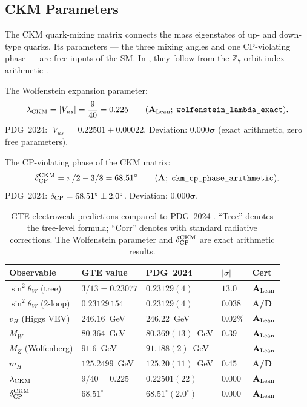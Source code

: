 \documentclass[11pt,openany]{book}
\theoremstyle{remark}
\newcommand{\GTE}{\text{GTE}}
\newcommand{\lean}[1]{%
  \penalty-100
  \begingroup\def\_{\textunderscore\allowbreak}\texttt{#1}\endgroup}
\newcommand{\sigW}{\sin^2\!\theta_W}
\newcommand{\CatA}{\textbf{A}}
\newcommand{\CatAL}{\ensuremath{\textbf{A}_{\rm Lean}}}
\newcommand{\CatAD}{\textbf{A/D}}
\begin{document}
\subsection*{CKM Parameters}

The CKM quark-mixing matrix connects the mass eigenstates of up- and down-type quarks.
Its parameters --- the three mixing angles and one CP-violating phase --- are free inputs
of the SM.  In \GTE{}, they follow from the $\mathbb{Z}_7$ orbit index arithmetic
\cite{SpivackCKM}.

The Wolfenstein expansion parameter:
\begin{equation}
  \lambda_{\rm CKM} = |V_{us}| = \frac{9}{40} = 0.225
  \qquad (\CatAL;\;\lean{wolfenstein\_lambda\_exact}).
  \label{eq:wolfenstein}
\end{equation}
PDG~2024: $|V_{us}| = 0.22501 \pm 0.00022$.  Deviation: $\mathbf{0.000\sigma}$ (exact
arithmetic, zero free parameters).

The CP-violating phase of the CKM matrix:
\begin{equation}
  \delta_{\rm CP}^{\rm CKM} = \pi/2 - 3/8 = 68.51^\circ
  \qquad (\CatA;\;\lean{ckm\_cp\_phase\_arithmetic}).
  \label{eq:ckm_cp}
\end{equation}
PDG~2024: $\delta_{\rm CP} = 68.51^\circ \pm 2.0^\circ$.  Deviation:
$\mathbf{0.000\sigma}$.

\begin{table}[htbp]
\centering
\caption{GTE electroweak predictions compared to PDG~2024
\cite{ParticleDataGroup2024,SpivackGTEUnification,SpivackWeinbergAngle,SpivackCKM}.
``Tree'' denotes the tree-level \GTE{} formula; ``Corr'' denotes with standard
radiative corrections.  The Wolfenstein parameter and $\delta_{\rm CP}^{\rm CKM}$ are
exact arithmetic results.}
\label{tab:ew_predictions}
\renewcommand{\arraystretch}{1.25}
\begin{tabular}{P{3.8cm}P{2.6cm}P{2.6cm}P{1.3cm}P{1.3cm}}
\toprule
Observable & GTE value & PDG~2024 & $|\sigma|$ & Cert \\
\midrule
$\sigW$ (tree) & $3/13 = 0.23077$ & $0.23129(4)$ & $13.0$ & \CatAL \\
$\sigW$ (2-loop) & $0.23129\,154$ & $0.23129(4)$ & $0.038$ & \CatAD \\
$v_H$ (Higgs VEV) & $246.16$~GeV & $246.22$~GeV & $0.02\%$ & \CatAL \\
$M_W$ & $80.364$~GeV & $80.369(13)$~GeV & $0.39$ & \CatAL \\
$M_Z$ (Wolfenberg) & $91.6$~GeV & $91.188(2)$~GeV & — & \CatAL \\
$m_H$ & $125.2499$~GeV & $125.20(11)$~GeV & $0.45$ & \CatAD \\
$\lambda_{\rm CKM}$ & $9/40 = 0.225$ & $0.22501(22)$ & $0.000$ & \CatAL \\
$\delta_{\rm CP}^{\rm CKM}$ & $68.51^\circ$ & $68.51^\circ(2.0^\circ)$ & $0.000$ & \CatAL \\
\bottomrule
\end{tabular}
\end{table}
\end{document}
